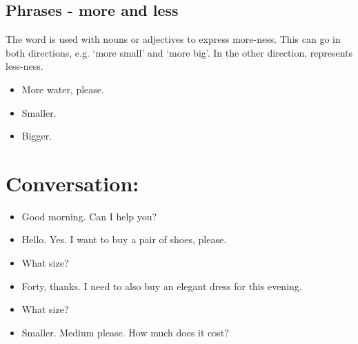 \subsection{Phrases - more and less}

The word  is used with nouns or adjectives to express more-ness. This can go in both 
directions, e.g. `more small' and `more big'. In the other direction,  represents less-ness.

\begin{itemize}
	\item More water, please.      \\
	\item Smaller.                \\
	\item Bigger.                 \\
\end{itemize}

\section{Conversation: } \label{0307-Conversation}

\begin{itemize}
    \item [Luigi] Good morning. Can I help you? \\
    \item [Francesca] Hello. Yes. I want to buy a pair of shoes, please. \\
    \item [Luigi] What size? \\
    \item [Francesca] Forty, thanks. I need to also buy an elegant dress for this evening. \\
    \item [Luigi] What size? \\
    \item [Francesca] Smaller. Medium please. How much does it cost?    \\
\end{itemize}


